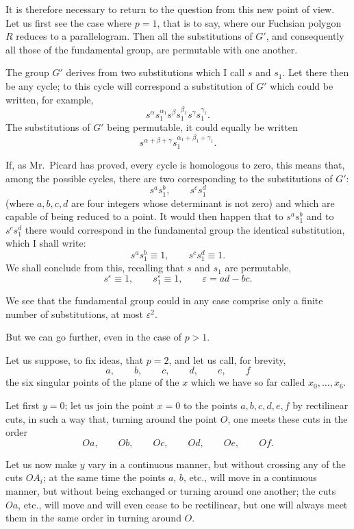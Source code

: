 \documentclass{article}
\begin{document}
It is therefore necessary to return to the question from this new point of view. Let us first see the case where $p = 1$, that is to say, where our Fuchsian polygon $R$ reduces to a parallelogram. Then all the substitutions of $G'$, and consequently all those of the fundamental group, are permutable with one another.

The group $G'$ derives from two substitutions which I call $s$ and $s_{1}$. Let there then be any cycle; to this cycle will correspond a substitution
of $G'$ which could be written, for example,
\[ s^{\alpha} s^{\alpha_{1}}_{1} s^{\beta} s^{\beta_{1}}_{1} s^{\gamma} s^{\gamma_{1}}_{1}. \]
The substitutions of $G'$ being permutable, it could equally be written
\[ s^{\alpha+\beta+\gamma} s^{\alpha_{1}+\beta_{1}+\gamma_{1}}_{1}. \]

If, as Mr.~Picard has proved, every cycle is homologous to zero, this means that, among the possible cycles, there are two corresponding to the substitutions of $G'$:
\[ s^{a} s^{b}_{1}, \qquad s^{c} s^{d}_{1} \]
(where $a, b, c, d$ are four integers whose determinant is not zero) and which are capable of being reduced to a point. It would then happen that to $s^{a} s^{b}_{1}$ and to $s^{c} s^{d}_{1}$ there would correspond in the fundamental group the identical substitution, which I shall write:
\[ s^{a} s^{b}_{1} \equiv 1, \qquad s^{c} s^{d}_{1} \equiv 1. \]
We shall conclude from this, recalling that $s$ and $s_{1}$ are permutable,
\[ s^{\varepsilon} \equiv 1, \qquad s^{\varepsilon}_{1} \equiv 1, \qquad \varepsilon = ad - bc. \]

We see that the fundamental group could in any case comprise only a finite number of substitutions, at most $\varepsilon^{2}$.

But we can go further, even in the case of $p > 1$.

Let us suppose, to fix ideas, that $p = 2$, and let us call, for brevity,
\[ a, \qquad b, \qquad c, \qquad d, \qquad e, \qquad f \]
the six singular points of the plane of the $x$ which we have so far called $x_{0}, \ldots, x_{6}$.

Let first $y = 0$; let us join the point $x = 0$ to the points $a, b, c, d, e, f$ by rectilinear cuts, in such a way that, turning around the point $O$, one meets these cuts in the order
\[ Oa, \qquad Ob, \qquad Oc, \qquad Od, \qquad Oe, \qquad Of. \]

Let us now make $y$ vary in a continuous manner, but without crossing any of the cuts $OA_{i}$; at the same time the points $a$,
$b$, etc., will move in a continuous manner, but without being exchanged or turning around one another; the cuts $Oa$, etc., will move and will even cease to be rectilinear, but one will always meet them in the same order in turning around $O$.
\end{document}
